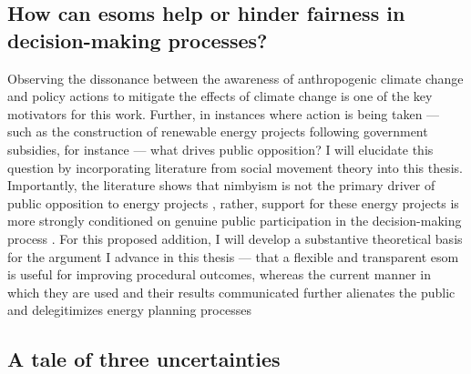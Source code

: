 \subsection{How can \acp{esom} help or hinder fairness in decision-making
processes?} Observing the dissonance between the awareness of anthropogenic
climate change and policy actions to mitigate the effects of climate change is
one of the key motivators for this work. Further, in instances where action is
being taken --- such as the construction of renewable energy projects following
government subsidies, for instance --- what drives public opposition? I will
elucidate this question by incorporating literature from social movement theory
\cite{mcadam_social_2017,mcadam_putting_2012} into this thesis. Importantly, the
literature shows that \ac{nimbyism} is not the primary driver of public
opposition to energy projects \cite{konisky_proximity_2021}, rather, support for
these energy projects is more strongly conditioned on genuine public
participation in the decision-making process
\cite{summers_influencing_2020,ottinger_procedural_2014,
walker_procedural_2017,barragan-contreras_procedural_2022,gonyo_resident_2021}.
For this proposed addition, I will develop a substantive theoretical basis for
the argument I advance in this thesis --- that a flexible and transparent
\ac{esom} is useful for improving procedural outcomes, whereas the current
manner in which they are used and their results communicated  
further alienates the public \cite{wynne_misunderstood_1992} and delegitimizes
energy planning processes


\subsection{A tale of three uncertainties}
\label{section:three-uncertainties}


